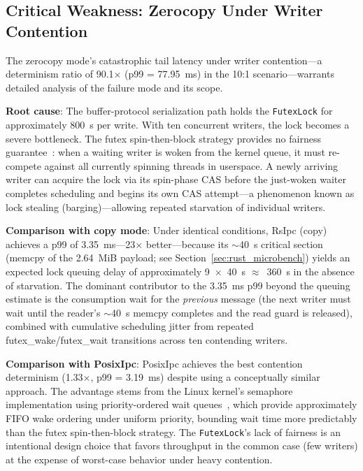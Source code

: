 \subsection{Critical Weakness: Zerocopy Under Writer Contention}

The zerocopy mode's catastrophic tail latency under writer contention---a determinism ratio of 90.1$\times$ (p99 = 77.95~ms) in the 10:1 scenario---warrants detailed analysis of the failure mode and its scope.

\textbf{Root cause}: The buffer-protocol serialization path holds the \texttt{FutexLock} for approximately 800~\textmu s per write. With ten concurrent writers, the lock becomes a severe bottleneck. The futex spin-then-block strategy provides no fairness guarantee~\cite{drepper2005}: when a waiting writer is woken from the kernel queue, it must re-compete against all currently spinning threads in userspace. A newly arriving writer can acquire the lock via its spin-phase CAS before the just-woken waiter completes scheduling and begins its own CAS attempt---a phenomenon known as lock stealing (barging)---allowing repeated starvation of individual writers.

\textbf{Comparison with copy mode}: Under identical conditions, RsIpc (copy) achieves a p99 of 3.35~ms---23$\times$ better---because its $\sim$40~\textmu s critical section (memcpy of the 2.64~MiB payload; see Section~\ref{sec:rust_microbench}) yields an expected lock queuing delay of approximately 9~$\times$~40~\textmu s $\approx$~360~\textmu s in the absence of starvation. The dominant contributor to the 3.35~ms p99 beyond the queuing estimate is the consumption wait for the \emph{previous} message (the next writer must wait until the reader's $\sim$40~\textmu s memcpy completes and the read guard is released), combined with cumulative scheduling jitter from repeated futex\_wake/futex\_wait transitions across ten contending writers.

\textbf{Comparison with PosixIpc}: PosixIpc achieves the best contention determinism (1.33$\times$, p99 = 3.19~ms) despite using a conceptually similar approach. The advantage stems from the Linux kernel's semaphore implementation using priority-ordered wait queues~\cite{drepper2005}, which provide approximately FIFO wake ordering under uniform priority, bounding wait time more predictably than the futex spin-then-block strategy. The \texttt{FutexLock}'s lack of fairness is an intentional design choice that favors throughput in the common case (few writers) at the expense of worst-case behavior under heavy contention.

